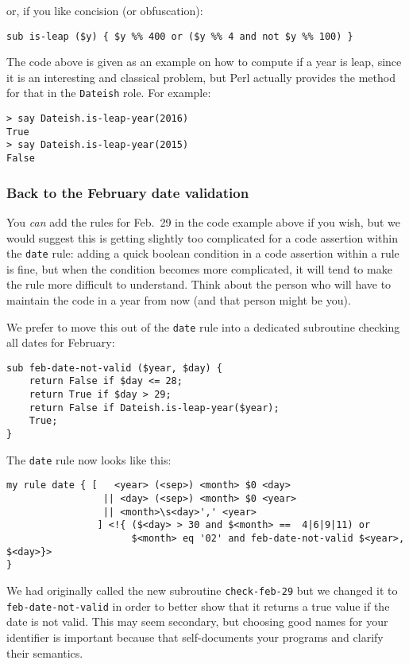 {or, if you like concision (or obfuscation):
\begin{verbatim}
sub is-leap ($y) { $y %% 400 or ($y %% 4 and not $y %% 100) }
\end{verbatim}

The code above is given as an example on how to compute 
if a year is leap, since it is an interesting and 
classical problem, but Perl actually provides the method for that 
in the {\tt Dateish} role. For example:

\begin{verbatim}
> say Dateish.is-leap-year(2016)
True
> say Dateish.is-leap-year(2015)
False
\end{verbatim}

\subsubsection{Back to the February date validation}

You \emph{can} add the rules for Feb.~29 in the code example 
above if you wish, but we would suggest this is getting 
slightly too complicated for a code assertion within 
the {\tt date} rule: adding a quick boolean condition 
in a code assertion within a rule is fine, but when 
the condition becomes more complicated, it will tend 
to make the rule more difficult to understand. Think 
about the person who will have to maintain the code in 
a year from now (and that person might be you).
 
We prefer to move this out of the {\tt date} rule into 
a dedicated subroutine checking all dates for February:

\begin{verbatim}
sub feb-date-not-valid ($year, $day) {
    return False if $day <= 28;
    return True if $day > 29;
    return False if Dateish.is-leap-year($year);
    True;
}
\end{verbatim}

The {\tt date} rule now looks like this:

\begin{verbatim}
my rule date { [   <year> (<sep>) <month> $0 <day> 
                 || <day> (<sep>) <month> $0 <year> 
                 || <month>\s<day>',' <year>
                ] <!{ ($<day> > 30 and $<month> ==  4|6|9|11) or 
                      $<month> eq '02' and feb-date-not-valid $<year>, $<day>}>
} 
\end{verbatim}

We had originally called the new subroutine {\tt check-feb-29} 
but we changed it to {\tt feb-date-not-valid} in order to 
better show that it returns a true value if the date 
is not valid. This may seem secondary, but choosing good 
names for your identifier is important because that 
self-documents your programs and clarify their semantics.

}
